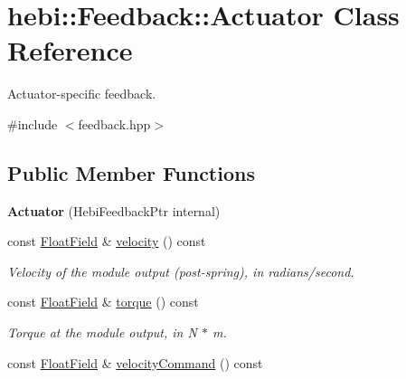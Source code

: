 \hypertarget{classhebi_1_1Feedback_1_1Actuator}{}\section{hebi\+:\+:Feedback\+:\+:Actuator Class Reference}
\label{classhebi_1_1Feedback_1_1Actuator}


Actuator-\/specific feedback.  




{\ttfamily \#include $<$feedback.\+hpp$>$}

\subsection*{Public Member Functions}
\begin{DoxyCompactItemize}
\item 
\mbox{\label{classhebi_1_1Feedback_1_1Actuator_a2af3d7a0d6291196a10c08fe707f0c09}} 
{\bfseries Actuator} (Hebi\+Feedback\+Ptr internal)
\item 
\mbox{\label{classhebi_1_1Feedback_1_1Actuator_aa74b5d7bcd1df8944f00058d727bf466}} 
const \hyperlink{classhebi_1_1Feedback_1_1FloatField}{Float\+Field} \& \hyperlink{classhebi_1_1Feedback_1_1Actuator_aa74b5d7bcd1df8944f00058d727bf466}{velocity} () const
\begin{DoxyCompactList}\small\item\em Velocity of the module output (post-\/spring), in radians/second. \end{DoxyCompactList}\item 
\mbox{\label{classhebi_1_1Feedback_1_1Actuator_a353436ed451bd22a34f6d42053a64b6a}} 
const \hyperlink{classhebi_1_1Feedback_1_1FloatField}{Float\+Field} \& \hyperlink{classhebi_1_1Feedback_1_1Actuator_a353436ed451bd22a34f6d42053a64b6a}{torque} () const
\begin{DoxyCompactList}\small\item\em Torque at the module output, in N $\ast$ m. \end{DoxyCompactList}\item 
\mbox{\label{classhebi_1_1Feedback_1_1Actuator_a48358540dc0da8e30638267897076a00}} 
const \hyperlink{classhebi_1_1Feedback_1_1FloatField}{Float\+Field} \& \hyperlink{classhebi_1_1Feedback_1_1Actuator_a48358540dc0da8e30638267897076a00}{velocity\+Command} () const

\end{DoxyCompactItemize}
